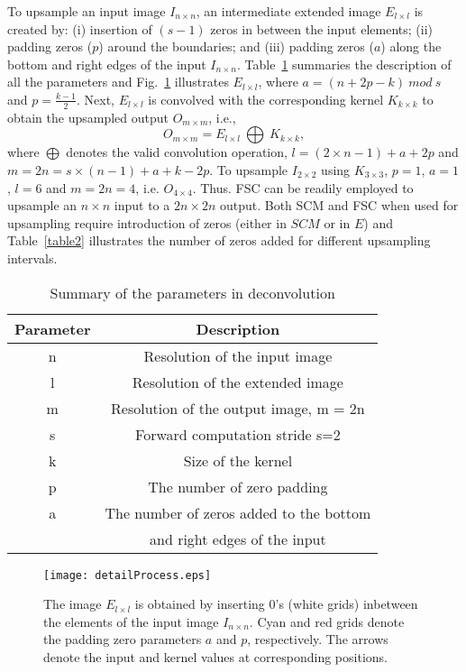 \documentclass[journal]{IEEEtran}
\begin{document}
To upsample an input image $I_{n \times n}$, an intermediate extended image $E_{l \times l}$ is created by: (i) insertion of $(s-1)$ zeros in between the input elements; (ii) padding zeros ($ p $)  around the boundaries; and (iii) padding zeros ($a$) along the bottom and right edges of the input $I_{n \times n}$. Table~\ref{table1} summaries the description of all the parameters and Fig.~\ref{fig3} illustrates $E_{l \times l}$, where  $a = (n+2p-k)\ mod \ s$ and $p = \frac{k-1}{2}$.
Next, $E_{l \times l}$ is convolved with the corresponding kernel $K_{k \times k}$ to obtain the upsampled output $O_{m \times m}$, i.e.,
\begin{equation}
     O_{m \times m} = E_{l \times l} \ \bigoplus\ K_{k \times k},
\end{equation}
where $\bigoplus$ denotes the valid convolution operation, $l = (2 \times n - 1) + a + 2p $ and $m = 2n = s \times (n - 1) + a + k - 2p$. To upsample $I_{2\times2}$ using $K_{3\times3}$, $p=1$, $a=1$, $l=6$ and $m=2n=4$, i.e. $O_{4\times4}$. Thus. FSC can be readily employed to upsample an $n\times n$ input to a $2n\times2n$ output.  Both SCM and FSC when used for upsampling require introduction of zeros (either in $SCM$ or in $E$) and  Table~\ref{table2} illustrates the number of zeros added for different upsampling intervals.
\begin{table}[h]
\renewcommand{\arraystretch}{1}
\caption{Summary of the parameters in deconvolution}
\label{table1}
\centering
\begin{tabular}{cc}
\hline
Parameter		&Description\\
\hline
n	& Resolution of the input image\\
l	& Resolution of the extended image\\
m	& Resolution of the output image, m = 2n\\
s	&Forward computation stride s=2 \cite{article13}\\
k	& Size of the kernel\\
p	&The  number of zero padding\\
a	&The number of zeros added to the bottom \\ 
 &and right edges of the input\\
\hline
\end{tabular}
\end{table}

\begin{figure}[htb]
\centering
\texttt{[image: detailProcess.eps]}
\caption{The image $E_{l \times l}$ is obtained by inserting 0's (white grids) inbetween the elements of the input image $I_{n\times n}$. Cyan and red grids denote the padding zero parameters $a$ and $p$, respectively. The arrows denote the input and kernel values at corresponding positions.}
\label{fig3}
\end{figure}
\end{document}
